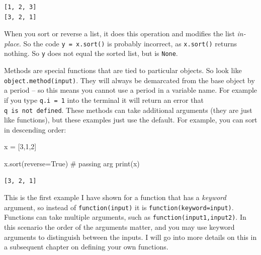 \documentclass[
  letterpaper,
]{scrbook}
\newenvironment{Shaded}{\begin{snugshade}}{\end{snugshade}}
\newcommand{\BuiltInTok}[1]{\textcolor[rgb]{0.00,0.23,0.31}{#1}}
\newcommand{\CommentTok}[1]{\textcolor[rgb]{0.37,0.37,0.37}{#1}}
\newcommand{\DecValTok}[1]{\textcolor[rgb]{0.68,0.00,0.00}{#1}}
\newcommand{\NormalTok}[1]{\textcolor[rgb]{0.00,0.23,0.31}{#1}}
\newcommand{\OperatorTok}[1]{\textcolor[rgb]{0.37,0.37,0.37}{#1}}
\newcommand{\VariableTok}[1]{\textcolor[rgb]{0.07,0.07,0.07}{#1}}
\begin{document}
\begin{verbatim}
[1, 2, 3]
[3, 2, 1]
\end{verbatim}

\begin{tcolorbox}[enhanced jigsaw, toprule=.15mm, rightrule=.15mm, arc=.35mm, opacityback=0, coltitle=black, bottomrule=.15mm, left=2mm, opacitybacktitle=0.6, bottomtitle=1mm, colback=white, colframe=quarto-callout-note-color-frame, colbacktitle=quarto-callout-note-color!10!white, titlerule=0mm, breakable, title={Note}, toptitle=1mm, leftrule=.75mm]

When you sort or reverse a list, it does this operation and modifies the
list \emph{in-place}. So the code \texttt{y\ =\ x.sort()} is probably
incorrect, as \texttt{x.sort()} returns nothing. So \texttt{y} does not
equal the sorted list, but is \texttt{None}.

\end{tcolorbox}

Methods are special functions that are tied to particular objects. So
look like \texttt{object.method(input)}. They will always be demarcated
from the base object by a period -- so this means you cannot use a
period in a variable name. For example if you type \texttt{q.i\ =\ 1}
into the terminal it will return an error that
\texttt{q\ is\ not\ defined}. These methods can take additional
arguments (they are just like functions), but these examples just use
the default. For example, you can sort in descending order:

\begin{Shaded}
\begin{Highlighting}[]
\NormalTok{x }\OperatorTok{=}\NormalTok{ [}\DecValTok{3}\NormalTok{,}\DecValTok{1}\NormalTok{,}\DecValTok{2}\NormalTok{]}

\NormalTok{x.sort(reverse}\OperatorTok{=}\VariableTok{True}\NormalTok{) }\CommentTok{\# passing arg}
\BuiltInTok{print}\NormalTok{(x)}
\end{Highlighting}
\end{Shaded}

\begin{verbatim}
[3, 2, 1]
\end{verbatim}

\begin{tcolorbox}[enhanced jigsaw, toprule=.15mm, rightrule=.15mm, arc=.35mm, opacityback=0, coltitle=black, bottomrule=.15mm, left=2mm, opacitybacktitle=0.6, bottomtitle=1mm, colback=white, colframe=quarto-callout-note-color-frame, colbacktitle=quarto-callout-note-color!10!white, titlerule=0mm, breakable, title={Note}, toptitle=1mm, leftrule=.75mm]

This is the first example I have shown for a function that has a
\emph{keyword} argument, so instead of \texttt{function(input)} it is
\texttt{function(keyword=input)}. Functions can take multiple arguments,
such as \texttt{function(input1,input2)}. In this scenario the order of
the arguments matter, and you may use keyword arguments to distinguish
between the inputs. I will go into more details on this in a subsequent
chapter on defining your own functions.

\end{tcolorbox}
\end{document}
